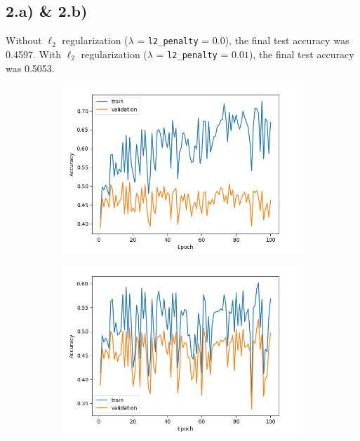 \documentclass[a4paper, 12pt]{article}
\begin{document}
\subsection*{2.a) \& 2.b)}

Without $\ell_2$ regularization ($\lambda$ = \texttt{l2\_penalty} = $0.0$), the final test accuracy was 0.4597. With $\ell_2$ regularization ($\lambda$ = \texttt{l2\_penalty} = $0.01$), the final test accuracy was 0.5053.
\vspace{-0.5cm}

\begin{figure}[H]
    \centering
    \begin{subfigure}{0.47\textwidth}
        \includegraphics[width=\textwidth]{plot/q1_2a.png}
        \label{fig:without_reg}
    \end{subfigure}
    \hfill
    \begin{subfigure}{0.47\textwidth}
        \includegraphics[width=\textwidth]{plot/q1_2b.png}

\end{subfigure}
\end{figure}
\end{document}
